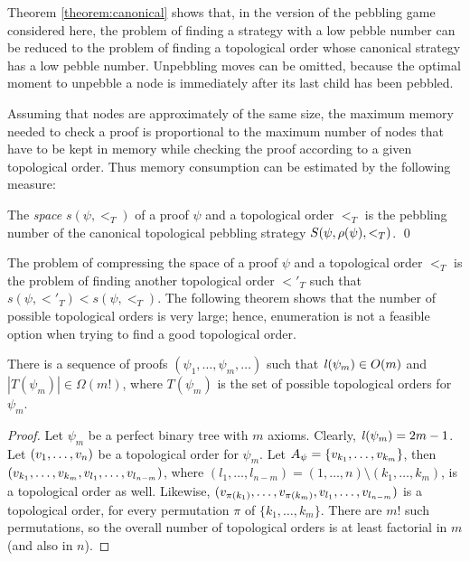 \documentclass{llncs}
\begin{document}
\noindent
Theorem \ref{theorem:canonical} shows that, in the version of the pebbling game considered here, the problem of finding a strategy with a low pebble number can be reduced to the problem of finding a topological order whose canonical strategy has a low pebble number. Unpebbling moves can be omitted, because the optimal moment to unpebble a node is immediately after its last child has been pebbled.

Assuming that nodes are approximately of the same size, the maximum memory needed to check a proof is proportional to the maximum number of nodes that have to be kept in memory while checking the proof according to a given topological order. Thus memory consumption can be estimated by the following measure:

\newcommand{\pspace}[2]{s(#1,#2)}
\begin{definition}[Space]
\label{def:space measure}
The \emph{space} $\pspace{\psi}{<_T}$ 
of a proof $\psi$ and a topological order $<_T$ is the pebbling number of the canonical topological pebbling strategy $S(\psi,\rho(\psi),<_T)$.
\qed
\end{definition}

\noindent
The problem of compressing the space of a proof $\psi$ and a topological order $<_T$ is the problem of finding another topological order $<'_T$ such that $\pspace{\psi}{<'_T} < \pspace{\psi}{<_T}$. The following theorem shows that the number of possible topological orders is very large; hence, enumeration is not a feasible option when trying to find a good topological order.

\begin{theorem}
\label{theorem:enumeration}
There is a sequence of proofs $(\psi_1,\ldots,\psi_m,\ldots)$ such that $\mathit{l}(\psi_m) \in O(m)$ and $|T(\psi_m)| \in \Omega(m!)$, where $T(\psi_m)$ is the set of possible topological orders for $\psi_m$.
\end{theorem}
\begin{proof}
Let $\psi_m$ be a perfect binary tree with $m$ axioms. Clearly, $\mathit{l}(\psi_m) = 2m-1$.
Let $(v_1,\ldots,v_n)$ be a topological order for $\psi_m$. 
Let $A_{\psi} = \{v_{k_1},\ldots,v_{k_m}\}$, then $(v_{k_1},\ldots,v_{k_m},v_{l_1},\ldots,v_{l_{n-m}})$, where $(l_1,\ldots,l_{n-m}) = (1,\ldots,n) \setminus (k_1,\ldots,k_m)$, is a topological order as well. 
Likewise, $(v_{\pi({k_1})},\ldots,v_{\pi({k_m})},v_{l_1},\ldots,v_{l_{n-m}})$ is a topological order, for every permutation $\pi$ of $\{k_1,\ldots,k_m\}$. There are $m!$ such permutations, so the overall number of topological orders is at least factorial in $m$ (and also in $n$).
\end{proof}
\end{document}
